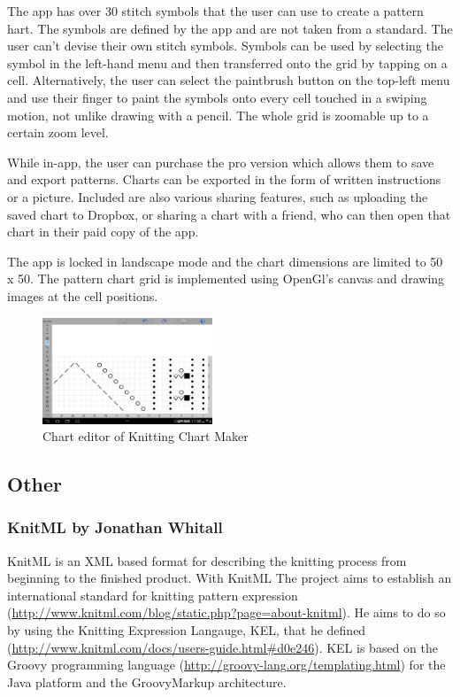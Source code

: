 \documentclass[a4paper,11pt]{kth-mag}
\begin{document}
The app has over 30 stitch symbols that the user can use to create a pattern
hart. The symbols are defined by the app and are not taken from a standard. The
user can’t devise their own stitch symbols. Symbols can be used by selecting
the symbol in the left-hand menu and then transferred onto the grid by tapping
on a cell. Alternatively, the user can select the paintbrush button on the
top-left menu and use their finger to paint the symbols onto every cell touched
in a swiping motion, not unlike drawing with a pencil. The whole grid is
zoomable up to a certain zoom level.

While in-app, the user can purchase the pro version which allows them to save
and export patterns. Charts can be exported in the form of written instructions
or a picture. Included are also various sharing features, such as uploading the
saved chart to Dropbox, or sharing a chart with a friend, who can then open that
chart in their paid copy of the app.

The app is locked in landscape mode and the chart dimensions are limited to
50 x 50. The pattern chart grid is implemented using OpenGl’s canvas and drawing
images at the cell positions.

\begin{figure}[H]
  \begin{center}
\includegraphics[width=2in]{images/image03.png}
\caption{Chart editor of Knitting Chart Maker}
\label{fig_knittingchartmaker}
\end{center}
\end{figure}

\subsection{Other}

\subsubsection{KnitML by Jonathan Whitall}
KnitML is an XML based format for describing the knitting process from beginning
to the finished product. With KnitML The project aims to establish an
international standard for knitting pattern expression (\url{http://www.knitml.com/blog/static.php?page=about-knitml}).
He aims to do so by using the Knitting Expression Langauge, KEL, that he defined
(\url{http://www.knitml.com/docs/users-guide.html#d0e246}). KEL is based on the
Groovy programming language (\url{http://groovy-lang.org/templating.html}) for
the Java platform and the GroovyMarkup architecture.
\end{document}
